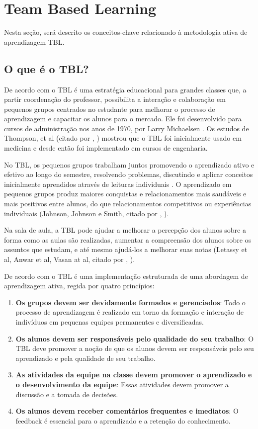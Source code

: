 \section{Team Based Learning}

Nesta seção, será descrito os conceitos-chave relacionado à metodologia ativa de aprendizagem TBL.

\subsection{O que é o TBL?}

De acordo com \cite{burgess} o TBL é uma estratégia educacional para grandes classes que, a partir coordenação do professor, possibilita a interação e colaboração em pequenos grupos centrados no estudante para melhorar o processo de aprendizagem e capacitar os alunos para o mercado. Ele foi desenvolvido para cursos de administração nos anos de 1970, por Larry Michaelsen \cite{sweet}. Os estudos de Thompson, et al (citado por \citeauthor{matalonga}, \citeyear{matalonga}) mostrou que o TBL foi inicialmente usado em medicina e desde então foi implementado em cursos de engenharia.

No TBL, os pequenos grupos trabalham juntos promovendo o aprendizado ativo e efetivo ao longo do semestre, resolvendo problemas, discutindo e aplicar conceitos inicialmente aprendidos através de leituras individuais \cite{gomez}. O aprendizado em pequenos grupos produz maiores conquistas e relacionamentos mais saudáveis e mais positivos entre alunos, do que relacionamentos competitivos ou experiências individuais (Johnson, Johnson e Smith, citado por \citeauthor{gomez}, \citeyear{gomez}).

Na sala de aula, a TBL pode ajudar a melhorar a percepção dos alunos sobre a forma como as aulas são realizadas, aumentar a compreensão dos alunos sobre os assuntos que estudam, e até mesmo ajudá-los a melhorar suas notas (Letassy et al, Anwar et al, Vasan at al, citado por \citeauthor{cabrera}, \citeyear{cabrera}).

De acordo com \cite{sweet} o TBL é uma implementação estruturada de uma abordagem de aprendizagem ativa, regida por quatro princípios:

\begin{enumerate}
  \item \textbf{Os grupos devem ser devidamente formados e gerenciados}: Todo o processo de aprendizagem é realizado em torno da formação e interação de indivíduos em pequenas equipes permanentes e diversificadas.
  \item \textbf{Os alunos devem ser responsáveis pelo qualidade do seu trabalho}: O TBL deve promover a noção de que os alunos devem ser responsáveis pelo seu aprendizado e pela qualidade de seu trabalho.
  \item \textbf{As atividades da equipe na classe devem promover o aprendizado e o desenvolvimento da equipe}: Essas atividades devem promover a discussão e a tomada de decisões.
  \item \textbf{Os alunos devem receber comentários frequentes e imediatos}: O feedback é essencial para o aprendizado e a retenção do conhecimento.
\end{enumerate}

